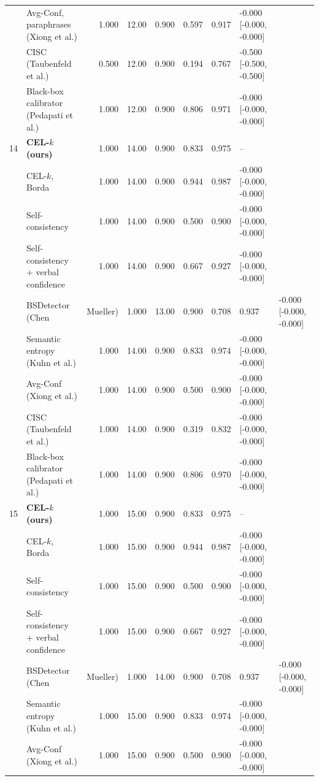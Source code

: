\begin{table}[t]
\begin{tabular}{llrrrrrl}
 & Avg-Conf, paraphrases (Xiong et al.) & 1.000 & 12.00 & 0.900 & 0.597 & 0.917 & -0.000 [-0.000, -0.000] \\
 & CISC (Taubenfeld et al.) & 0.500 & 12.00 & 0.900 & 0.194 & 0.767 & -0.500 [-0.500, -0.500] \\
 & Black-box calibrator (Pedapati et al.) & 1.000 & 12.00 & 0.900 & 0.806 & 0.971 & -0.000 [-0.000, -0.000] \\
14 & \textbf{CEL-$k$ (ours)} & 1.000 & 14.00 & 0.900 & 0.833 & 0.975 & -- \\
 & \quad CEL-$k$, Borda & 1.000 & 14.00 & 0.900 & 0.944 & 0.987 & -0.000 [-0.000, -0.000] \\
 & Self-consistency & 1.000 & 14.00 & 0.900 & 0.500 & 0.900 & -0.000 [-0.000, -0.000] \\
 & Self-consistency + verbal confidence & 1.000 & 14.00 & 0.900 & 0.667 & 0.927 & -0.000 [-0.000, -0.000] \\
 & BSDetector (Chen & Mueller) & 1.000 & 13.00 & 0.900 & 0.708 & 0.937 & -0.000 [-0.000, -0.000] \\
 & Semantic entropy (Kuhn et al.) & 1.000 & 14.00 & 0.900 & 0.833 & 0.974 & -0.000 [-0.000, -0.000] \\
 & Avg-Conf (Xiong et al.) & 1.000 & 14.00 & 0.900 & 0.500 & 0.900 & -0.000 [-0.000, -0.000] \\
 & CISC (Taubenfeld et al.) & 1.000 & 14.00 & 0.900 & 0.319 & 0.832 & -0.000 [-0.000, -0.000] \\
 & Black-box calibrator (Pedapati et al.) & 1.000 & 14.00 & 0.900 & 0.806 & 0.970 & -0.000 [-0.000, -0.000] \\
15 & \textbf{CEL-$k$ (ours)} & 1.000 & 15.00 & 0.900 & 0.833 & 0.975 & -- \\
 & \quad CEL-$k$, Borda & 1.000 & 15.00 & 0.900 & 0.944 & 0.987 & -0.000 [-0.000, -0.000] \\
 & Self-consistency & 1.000 & 15.00 & 0.900 & 0.500 & 0.900 & -0.000 [-0.000, -0.000] \\
 & Self-consistency + verbal confidence & 1.000 & 15.00 & 0.900 & 0.667 & 0.927 & -0.000 [-0.000, -0.000] \\
 & BSDetector (Chen & Mueller) & 1.000 & 14.00 & 0.900 & 0.708 & 0.937 & -0.000 [-0.000, -0.000] \\
 & Semantic entropy (Kuhn et al.) & 1.000 & 15.00 & 0.900 & 0.833 & 0.974 & -0.000 [-0.000, -0.000] \\
 & Avg-Conf (Xiong et al.) & 1.000 & 15.00 & 0.900 & 0.500 & 0.900 & -0.000 [-0.000, -0.000] \\

\end{tabular}
\end{table}
